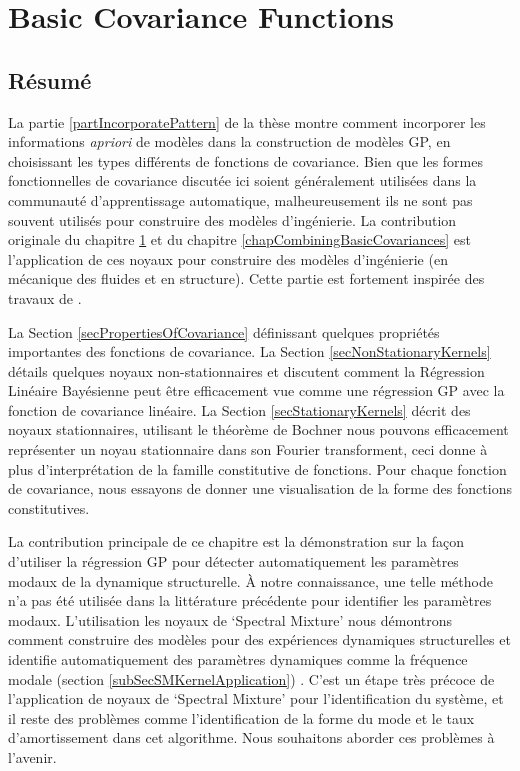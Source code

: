 \chapter{Basic Covariance Functions}
\label{chapBasicCovarianceKernels}

\begin{mdframed}[hidealllines=true,backgroundcolor=lightgray!20]
\section*{Résumé}
La partie \ref{partIncorporatePattern} de la thèse montre comment incorporer les informations \textit{apriori} de modèles dans la construction de modèles GP, en choisissant les types différents de fonctions de covariance. Bien que les formes fonctionnelles de covariance discutée ici soient généralement utilisées dans la communauté d'apprentissage automatique, malheureusement ils ne sont pas souvent utilisés pour construire des modèles d'ingénierie. La contribution originale du chapitre \ref{chapBasicCovarianceKernels} et du chapitre \ref{chapCombiningBasicCovariances} est l'application de ces noyaux pour construire des modèles d'ingénierie (en mécanique des fluides et en structure). Cette partie est fortement inspirée des travaux de \cite{duvenaud-thesis-2014, wilson2014thesis, lloyd2014automatic, durrande2001etude}.

La Section \ref{secPropertiesOfCovariance} définissant quelques propriétés importantes des fonctions de covariance. La Section \ref{secNonStationaryKernels}  détails quelques noyaux non-stationnaires et discutent comment la Régression Linéaire Bayésienne peut être efficacement vue comme une régression GP avec la fonction de covariance linéaire. La Section \ref{secStationaryKernels} décrit des noyaux stationnaires, utilisant le théorème de Bochner nous pouvons efficacement représenter un noyau stationnaire dans son Fourier transforment, ceci donne à plus d'interprétation de la famille constitutive de fonctions. Pour chaque fonction de covariance, nous essayons de donner une visualisation de la forme des fonctions constitutives. 

La contribution principale de ce chapitre est la démonstration sur la façon d'utiliser la régression GP pour détecter automatiquement les paramètres modaux de la dynamique structurelle. À notre connaissance, une telle méthode n'a pas été utilisée dans la littérature précédente pour identifier les paramètres modaux. L'utilisation les noyaux de `Spectral Mixture’ nous démontrons comment construire des modèles pour des expériences dynamiques structurelles et identifie automatiquement des paramètres dynamiques comme la fréquence modale (section \ref{subSecSMKernelApplication}) \cite{chiplunkar2017operational}. C'est un étape très précoce de l'application de noyaux de `Spectral Mixture’ pour l'identification du système, et il reste des problèmes comme l'identification de la forme du mode et le taux d'amortissement dans cet algorithme. Nous souhaitons aborder ces problèmes à l'avenir.
\end{mdframed}


